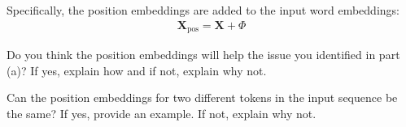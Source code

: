 \begin{parts}
    Specifically, the position embeddings are added to the input word embeddings:
    \begin{align*}
        \mathbf{X}_{\text{pos}} = \mathbf{X} + \Phi
    \end{align*}

    \begin{subparts}
        \subpart[1] Do you think the position embeddings will help the issue you identified in part (a)? If yes, explain how and if not, explain why not.

        \subpart[1] Can the position embeddings for two different tokens in the input sequence be the same? If yes, provide an example. If not, explain why not.

    \end{subparts}
\end{parts}